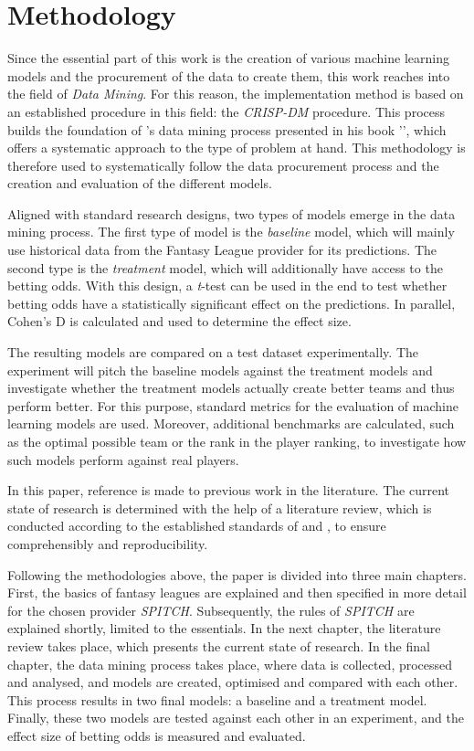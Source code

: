 \clearpage \section{Methodology}

Since the essential part of this work is the creation of various machine learning models and the procurement of the data to create them, this work reaches into the field of \emph{Data Mining}. For this reason, the implementation method is based on an established procedure in this field: the \emph{CRISP-DM} \parencite{chapman_crisp-dm_2000} procedure. This process builds the foundation of \citeauthor[]{geron_hands-machine_2019}'s data mining process presented in his book '', which offers a systematic approach to the type of problem at hand. This methodology is therefore used to systematically follow the data procurement process and the creation and evaluation of the different models.

Aligned with standard research designs, two types of models emerge in the data mining process. The first type of model is the \emph{baseline} model, which will mainly use historical data from the Fantasy League provider for its predictions. The second type is the \emph{treatment} model, which will additionally have access to the betting odds. With this design, a \emph{t}-test can be used in the end to test whether betting odds have a statistically significant effect on the predictions. In parallel, Cohen's D is calculated and used to determine the effect size.

The resulting models are compared on a test dataset experimentally. The experiment will pitch the baseline models against the treatment models and investigate whether the treatment models actually create better teams and thus perform better. For this purpose, standard metrics for the evaluation of machine learning models are used. Moreover, additional benchmarks are calculated, such as the optimal possible team or the rank in the player ranking, to investigate how such models perform against real players.

\clearpage In this paper, reference is made to previous work in the literature. The current state of research is determined with the help of a literature review, which is conducted according to the established standards of \citeauthor[]{webster_guest_2002} and \citeauthor[]{vom_brocke_standing_2015}, to ensure comprehensibly and reproducibility.

Following the methodologies above, the paper is divided into three main chapters. First, the basics of fantasy leagues are explained and then specified in more detail for the chosen provider \emph{SPITCH}. Subsequently, the rules of \emph{SPITCH} are explained shortly, limited to the essentials. In the next chapter, the literature review takes place, which presents the current state of research. In the final chapter, the data mining process takes place, where data is collected, processed and analysed, and models are created, optimised and compared with each other. This process results in two final models: a baseline and a treatment model. Finally, these two models are tested against each other in an experiment, and the effect size of betting odds is measured and evaluated.
